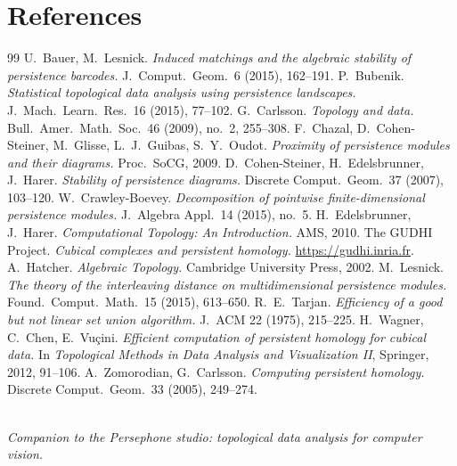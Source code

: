\documentclass[11pt]{article}
\theoremstyle{persdef}
\begin{document}
\section*{References}

\renewcommand{\refname}{\vspace*{-1em}}
\begin{thebibliography}{99}
 U.~Bauer, M.~Lesnick. \emph{Induced matchings and the algebraic stability of persistence barcodes.} J.~Comput.~Geom.~6 (2015), 162--191.
 P.~Bubenik. \emph{Statistical topological data analysis using persistence landscapes.} J.~Mach.~Learn.~Res.~16 (2015), 77--102.
 G.~Carlsson. \emph{Topology and data.} Bull.~Amer.~Math.~Soc.~46 (2009), no.~2, 255--308.
 F.~Chazal, D.~Cohen-Steiner, M.~Glisse, L.~J.~Guibas, S.~Y.~Oudot. \emph{Proximity of persistence modules and their diagrams.} Proc.~SoCG, 2009.
 D.~Cohen-Steiner, H.~Edelsbrunner, J.~Harer. \emph{Stability of persistence diagrams.} Discrete Comput.~Geom.~37 (2007), 103--120.
 W.~Crawley-Boevey. \emph{Decomposition of pointwise finite-dimensional persistence modules.} J.~Algebra Appl.~14 (2015), no.~5.
 H.~Edelsbrunner, J.~Harer. \emph{Computational Topology: An Introduction.} AMS, 2010.
 The GUDHI Project. \emph{Cubical complexes and persistent homology.} \url{https://gudhi.inria.fr}.
 A.~Hatcher. \emph{Algebraic Topology.} Cambridge University Press, 2002.
 M.~Lesnick. \emph{The theory of the interleaving distance on multidimensional persistence modules.} Found.~Comput.~Math.~15 (2015), 613--650.
 R.~E.~Tarjan. \emph{Efficiency of a good but not linear set union algorithm.} J.~ACM 22 (1975), 215--225.
 H.~Wagner, C.~Chen, E.~Vu\c{c}ini. \emph{Efficient computation of persistent homology for cubical data.} In \emph{Topological Methods in Data Analysis and Visualization II}, Springer, 2012, 91--106.
 A.~Zomorodian, G.~Carlsson. \emph{Computing persistent homology.} Discrete Comput.~Geom.~33 (2005), 249--274.
\end{thebibliography}

\vspace{2em}
\noindent\hrulefill\\
{\footnotesize\itshape Companion to the Persephone studio: topological data analysis for computer vision.}
\end{document}

